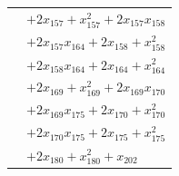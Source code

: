 \begin{longtable}{@{}r@{\;}l@{}}
 & \(\displaystyle +2x_{157} +x_{157}^{2} +2x_{157}x_{158}\) \\
 & \(\displaystyle +2x_{157}x_{164} +2x_{158} +x_{158}^{2}\) \\
 & \(\displaystyle +2x_{158}x_{164} +2x_{164} +x_{164}^{2}\) \\
 & \(\displaystyle +2x_{169} +x_{169}^{2} +2x_{169}x_{170}\) \\
 & \(\displaystyle +2x_{169}x_{175} +2x_{170} +x_{170}^{2}\) \\
 & \(\displaystyle +2x_{170}x_{175} +2x_{175} +x_{175}^{2}\) \\
 & \(\displaystyle +2x_{180} +x_{180}^{2} +x_{202}\) \\[3pt]
\end{longtable}
\endgroup
